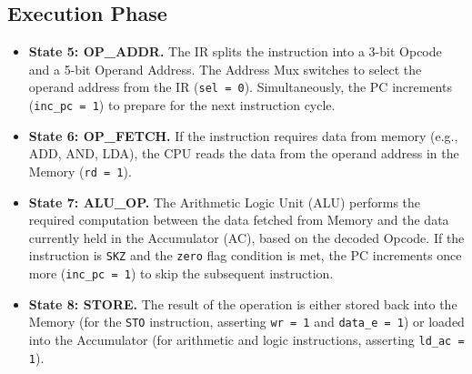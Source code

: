 \subsection{Execution Phase}
\begin{itemize}
	\item \textbf{State 5: OP\_ADDR.} The IR splits the instruction into a 3-bit Opcode and a 5-bit Operand Address. The Address Mux switches to select the operand address from the IR (\texttt{sel = 0}). Simultaneously, the PC increments (\texttt{inc\_pc = 1}) to prepare for the next instruction cycle.
	\item \textbf{State 6: OP\_FETCH.} If the instruction requires data from memory (e.g., ADD, AND, LDA), the CPU reads the data from the operand address in the Memory (\texttt{rd = 1}).
	\item \textbf{State 7: ALU\_OP.} The Arithmetic Logic Unit (ALU) performs the required computation between the data fetched from Memory and the data currently held in the Accumulator (AC), based on the decoded Opcode. If the instruction is \texttt{SKZ} and the \texttt{zero} flag condition is met, the PC increments once more (\texttt{inc\_pc = 1}) to skip the subsequent instruction.
	\item \textbf{State 8: STORE.} The result of the operation is either stored back into the Memory (for the \texttt{STO} instruction, asserting \texttt{wr = 1} and \texttt{data\_e = 1}) or loaded into the Accumulator (for arithmetic and logic instructions, asserting \texttt{ld\_ac = 1}).
\end{itemize}

